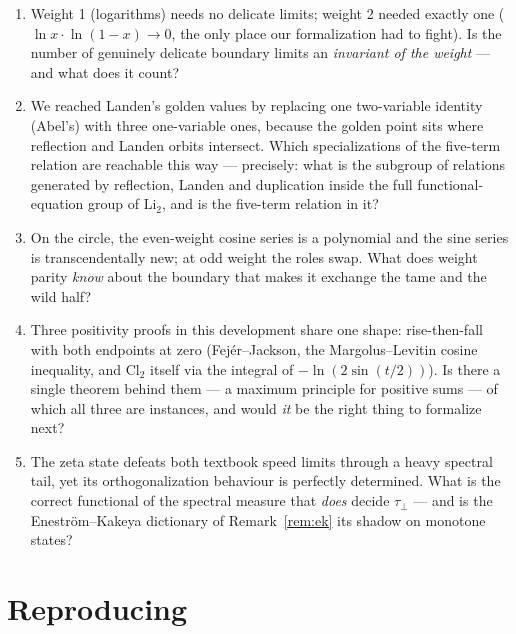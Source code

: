 \documentclass[11pt]{article}
\newcommand{\Li}{\mathrm{Li}_2}
\newcommand{\Cl}{\mathrm{Cl}_2}
\begin{document}
\begin{enumerate}
\item[\textbf{On Q1.}] Weight 1 (logarithms) needs no delicate limits; weight 2 needed
exactly one ($\ln x\cdot\ln(1-x)\to0$, the only place our formalization had to fight).
Is the number of genuinely delicate boundary limits an \emph{invariant of the weight}
--- and what does it count?

\item[\textbf{On Q2.}] We reached Landen's golden values by replacing one two-variable
identity (Abel's) with three one-variable ones, because the golden point sits where
reflection and Landen orbits intersect. Which specializations of the five-term relation
are reachable this way --- precisely: what is the subgroup of relations generated by
reflection, Landen and duplication inside the full functional-equation group of $\Li$,
and is the five-term relation in it?

\item[\textbf{On Q3.}] On the circle, the even-weight cosine series is a polynomial and
the sine series is transcendentally new; at odd weight the roles swap. What does weight
parity \emph{know} about the boundary that makes it exchange the tame and the wild
half?

\item[\textbf{On Q4.}] Three positivity proofs in this development share one shape:
rise-then-fall with both endpoints at zero (Fej\'er--Jackson, the Margolus--Levitin
cosine inequality, and $\Cl$ itself via the integral of $-\ln(2\sin(t/2))$). Is there a
single theorem behind them --- a maximum principle for positive sums --- of which all
three are instances, and would \emph{it} be the right thing to formalize next?

\item[\textbf{On Q5.}] The zeta state defeats both textbook speed limits through a
heavy spectral tail, yet its orthogonalization behaviour is perfectly determined. What
is the correct functional of the spectral measure that \emph{does} decide $\tau_\perp$
--- and is the Enestr\"om--Kakeya dictionary of Remark~\ref{rem:ek} its shadow on
monotone states?
\end{enumerate}

\appendix

\section{Reproducing}\label{app:repro}
\end{document}

